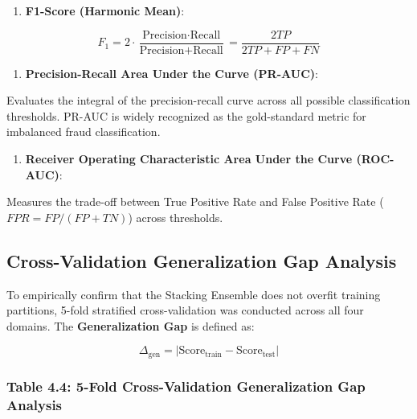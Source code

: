\documentclass[12pt,a4paper,oneside]{report}
\begin{document}
\begin{enumerate}[leftmargin=0.35in]
\item \textbf{F1-Score (Harmonic Mean)}:
\end{enumerate}
\begin{equation}
F_1 = 2 \cdot \frac{\text{Precision} \cdot \text{Recall}}{\text{Precision} + \text{Recall}} = \frac{2 TP}{2 TP + FP + FN}
\end{equation}

\begin{enumerate}[leftmargin=0.35in]
\item \textbf{Precision-Recall Area Under the Curve (PR-AUC)}:
\end{enumerate}
Evaluates the integral of the precision-recall curve across all possible classification thresholds. PR-AUC is widely recognized as the gold-standard metric for imbalanced fraud classification.


\begin{enumerate}[leftmargin=0.35in]
\item \textbf{Receiver Operating Characteristic Area Under the Curve (ROC-AUC)}:
\end{enumerate}
Measures the trade-off between True Positive Rate and False Positive Rate ($FPR = FP / (FP + TN)$) across thresholds.



\subsection{Cross-Validation Generalization Gap Analysis}

To empirically confirm that the Stacking Ensemble does not overfit training partitions, 5-fold stratified cross-validation was conducted across all four domains. The \textbf{Generalization Gap} is defined as:

\begin{equation}
\Delta_{\text{gen}} = |\text{Score}_{\text{train}} - \text{Score}_{\text{test}}|
\end{equation}

\subsubsection{Table 4.4: 5-Fold Cross-Validation Generalization Gap Analysis}
\end{document}
